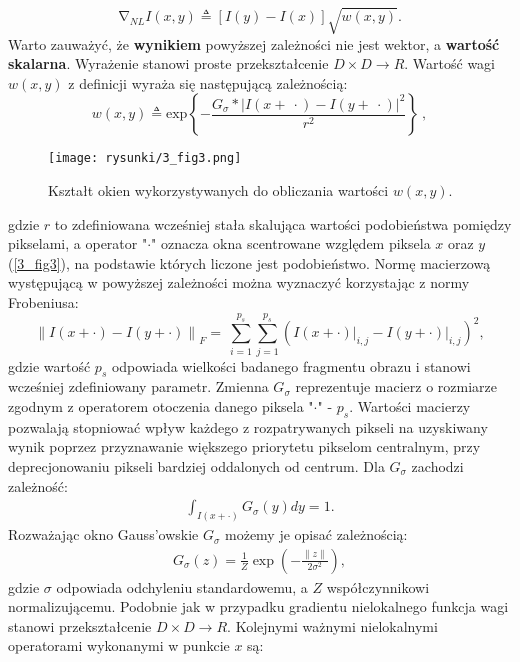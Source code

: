 \documentclass[12pt, twoside, openany]{report}
\theoremstyle{definition}
\begin{document}
\begin{equation}
{\mathrm{\nabla }}_{NL}I\left(x,y\right)\triangleq \left[I\left(y\right)-I\left(x\right)\right]\sqrt{w(x,y)}
\label{NLGRAD}
.
\end{equation}
Warto zauważyć, że \textbf{wynikiem} powyższej zależności nie jest wektor, a \textbf{wartość skalarna}. Wyrażenie stanowi proste przekształcenie $D \times D\longrightarrow R$. Wartość wagi $w(x,y)$ z definicji wyraża się następującą zależnością:
\begin{equation}
w\left(x,y\right)\triangleq {\mathrm{exp} \left\{-\frac{G_{\sigma }*{\left|I\left(x+\ \cdot \right)-I\left(y+\ \cdot \right)\right|}^2}{r^2}\right\}\ }
\label{NLWEIGHT}
,
\end{equation}
\begin{figure}[!h]
	\centering
	\texttt{[image: rysunki/3\_fig3.png]}
	\caption{Kształt okien wykorzystywanych do obliczania wartości $w(x,y)$.}
	\label{3_fig3}
\end{figure}
gdzie $r$ to zdefiniowana wcześniej stała skalująca wartości podobieństwa pomiędzy pikselami, a operator "$\cdot$" oznacza okna scentrowane względem piksela $x$ oraz $y$ (\autoref{3_fig3}), na podstawie których liczone jest podobieństwo. Normę macierzową występującą w powyższej zależności można wyznaczyć korzystając z normy Frobeniusa:
\begin{equation}
{\|I\left(x+\cdot \right)-I\left(y+\cdot \right)\|}_F=\ \sum^{p_s}_{i=1}{\sum^{p_s}_{j=1}{{\left(I(x+\cdot)\big|_{i,j}-I(y+\cdot)\big|_{i,j}\right)}^2}}
\label{FROBENIUS}
,
\end{equation}
gdzie wartość $p_s$ odpowiada wielkości badanego fragmentu obrazu i stanowi wcześniej zdefiniowany parametr. Zmienna $G_\sigma$ reprezentuje macierz o rozmiarze zgodnym z operatorem otoczenia danego piksela "$\cdot$" - $p_s$. Wartości macierzy pozwalają stopniować wpływ każdego z rozpatrywanych pikseli na uzyskiwany wynik poprzez przyznawanie większego priorytetu pikselom centralnym, przy deprecjonowaniu pikseli bardziej oddalonych od centrum. Dla $G_\sigma$ zachodzi zależność:
\begin{align}
\int_{I(x+\cdot)}G_{\sigma}(y)dy = 1.
\end{align}
Rozważając okno Gauss'owskie $G_\sigma$ możemy je opisać zależnością:
\begin{align}
G_\sigma(z)=\frac{1}{Z}\exp\left(-\frac{\|z\|}{2\sigma^2}\right),
\label{oknoGaussowskie}
\end{align}
gdzie $\sigma$ odpowiada odchyleniu standardowemu, a $Z$ współczynnikowi normalizującemu. Podobnie jak w przypadku gradientu nielokalnego funkcja wagi stanowi przekształcenie $D \times D\longrightarrow R$. Kolejnymi ważnymi nielokalnymi operatorami wykonanymi w punkcie $x$ są: 
\end{document}
